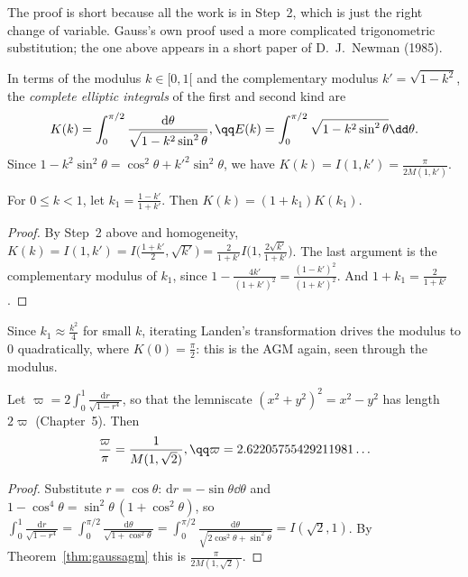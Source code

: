 The proof is short because all the work is in Step~2, which is just the right change of variable. Gauss's own proof used a more complicated trigonometric substitution; the one above appears in a short paper of D.~J.~Newman (1985).

In terms of the modulus $k\in[0,1[$ and the complementary modulus $k'=\sqrt{1-k^2}$, the \emph{complete elliptic integrals} of the first and second kind are
\[
\begin{gathered}K(k)=\int_0^{\pi/2}\frac{\mathrm d\theta}{\sqrt{1-k^2\sin^2\theta}},\qq E(k)=\int_0^{\pi/2}\sqrt{1-k^2\sin^2\theta}\dd\theta.\end{gathered}
\]
Since $1-k^2\sin^2\theta=\cos^2\theta+k'^2\sin^2\theta$, we have $K(k)=I(1,k')=\frac\pi{2M(1,k')}$.

\begin{corollary}\label{cor:landen}
For $0\le k<1$, let $k_1=\frac{1-k'}{1+k'}$. Then $K(k)=(1+k_1)K(k_1)$.
\end{corollary}
\begin{proof}
By Step~2 above and homogeneity, $K(k)=I(1,k')=I\bigl(\frac{1+k'}2,\sqrt{k'}\bigr)=\frac2{1+k'}I\bigl(1,\frac{2\sqrt{k'}}{1+k'}\bigr)$. The last argument is the complementary
modulus of $k_1$, since $1-\frac{4k'}{(1+k')^2}=\frac{(1-k')^2}{(1+k')^2}$. And $1+k_1=\frac2{1+k'}$.
\end{proof}

Since $k_1\approx\frac{k^2}4$ for small $k$, iterating Landen's transformation drives the modulus to $0$ quadratically, where $K(0)=\frac\pi2$: this is the AGM again,
seen through the modulus.

\begin{corollary}\label{cor:lemniscate}
Let $\varpi=2\int_0^1\frac{\mathrm dr}{\sqrt{1-r^4}}$, so that the lemniscate $(x^2+y^2)^2=x^2-y^2$ has length $2\varpi$ (Chapter~5). Then
\[
\begin{gathered}\frac\varpi\pi=\frac1{M(1,\sqrt2)},\qq\varpi=2.62205755429211981\ldots\end{gathered}
\]
\end{corollary}
\begin{proof}
Substitute $r=\cos\theta$: $\mathrm dr=-\sin\theta\dd\theta$ and $1-\cos^4\theta=\sin^2\theta\,(1+\cos^2\theta)$, so
$\int_0^1\frac{\mathrm dr}{\sqrt{1-r^4}}=\int_0^{\pi/2}\frac{\mathrm d\theta}{\sqrt{1+\cos^2\theta}}=\int_0^{\pi/2}\frac{\mathrm d\theta}{\sqrt{2\cos^2\theta+\sin^2\theta}}=I(\sqrt2,1)$. By Theorem~\ref{thm:gaussagm} this is
$\frac\pi{2M(1,\sqrt2)}$.
\end{proof}

